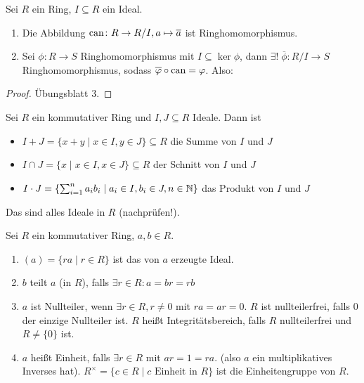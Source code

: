 \documentclass[12pt,a4paper]{scrartcl}
\begin{document}
\begin{satz}[Homomorphiesatz] \label{thm:homsatz_r}
	Sei $R$ ein Ring, $I\subseteq R$ ein Ideal. \begin{enumerate}
		\item Die Abbildung $\operatorname{can}\colon R\to R/I, a\mapsto \overline{a}$ ist Ringhomomorphismus.
		\item Sei $\phi\colon R\to S$ Ringhomomorphismus mit $I\subseteq \ker \phi$, dann $\exists!\;\overline{\phi}\colon R/I\to S$ Ringhomomorphismus, sodass $\overline{\varphi}\circ \operatorname{can}  = \varphi$. Also:
		\begin{center}
		\end{center}
	\end{enumerate}
\end{satz}

\begin{proof}
	Übungsblatt 3.
\end{proof} 

\begin{defi}
	Sei $R$ ein kommutativer Ring und $I, J\subseteq R$ Ideale. Dann ist \begin{itemize}
		\item $I+J = \{x+y \mid x\in I, y\in J\}\subseteq R$ die Summe von $I$ und $J$
		\item $I\cap J = \{x \mid x\in I, x\in J\}\subseteq R$ der Schnitt von $I$ und $J$
		\item $I\cdot J = \{\sum_{i = 1}^na_ib_i \mid a_i\in I, b_i\in J, n\in\mathbb N\}$ das Produkt von $I$ und $J$
	\end{itemize}
	Das sind alles Ideale in $R$ (nachprüfen!).
\end{defi}

\begin{defi}
	Sei $R$ ein kommutativer Ring, $a,b\in R$. \begin{enumerate}
		\item $(a) = \{ra\mid r\in R\}$ ist das von $a$ erzeugte Ideal.
		\item $b$ teilt $a$ (in $R$), falls $\exists r\in R: a = br = rb$
		\item 
		$a$ ist Nullteiler, wenn $\exists r\in R, r \neq 0$ mit $ra = ar = 0$. $R$ ist nullteilerfrei, falls 0 der einzige Nullteiler ist.
		$R$ heißt Integritätsbereich, falls $R$ nullteilerfrei und $R \neq \{0\}$ ist.
		\item $a$ heißt Einheit, falls $\exists r\in R$ mit $ar = 1 = ra$. (also $a$ ein multiplikatives Inverses hat).
		$R^{\times} = \{c\in R \mid c \text{ Einheit in } R\}$ ist die Einheitengruppe von $R$.
	\end{enumerate}
\end{defi}
\end{document}
